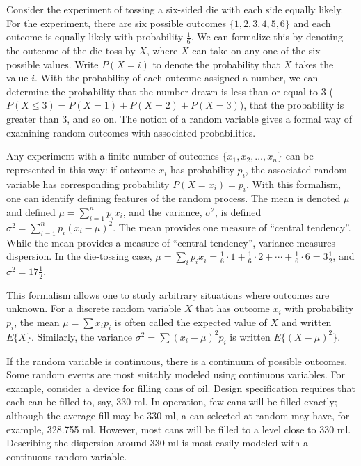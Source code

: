 \begin{original}
Consider the experiment of tossing a six-sided die with each side equally likely. For the experiment, there are six possible outcomes $\{1,2,3,4,5,6\}$ and each outcome is equally likely with probability $\frac{1}{6}$. We can formalize this by denoting the outcome of the die toss by $X$, where $X$ can take on any one of the six possible values. Write $P(X = i)$ to denote the probability that $X$ takes the value $i$. With the probability of each outcome assigned a number, we can determine the probability that the number drawn is less than or equal to $3$ ($P(X \leq 3) = P(X = 1) + P(X = 2) + P(X = 3)$), that the probability is greater than $3$, and so on. The notion of a random variable gives a formal way of examining random outcomes with associated probabilities.

Any experiment with a finite number of outcomes $\{x_1, x_2, \ldots, x_n\}$ can be represented in this way: if outcome $x_i$ has probability $p_i$, the associated random variable has corresponding probability $P(X = x_i) = p_i$. With this formalism, one can identify defining features of the random process. The mean is denoted $\mu$ and defined $\mu = \sum_{i=1}^{n} p_i x_i$, and the variance, $\sigma^2$, is defined $\sigma^2 = \sum_{i=1}^{n} p_i(x_i - \mu)^2$. The mean provides one measure of ``central tendency''. While the mean provides a measure of ``central tendency'', variance measures dispersion. In the die-tossing case, $\mu = \sum_i p_i x_i = \frac{1}{6}\cdot 1 + \frac{1}{6}\cdot 2 + \cdots + \frac{1}{6}\cdot 6 = 3\frac{1}{2}$, and $\sigma^2 = 17\frac{1}{2}$.

This formalism allows one to study arbitrary situations where outcomes are unknown. For a discrete random variable $X$ that has outcome $x_i$ with probability $p_i$, the mean $\mu = \sum x_i p_i$ is often called the expected value of $X$ and written $E\{X\}$. Similarly, the variance $\sigma^2 = \sum (x_i - \mu)^2 p_i$ is written $E\{(X - \mu)^2\}$.

If the random variable is continuous, there is a continuum of possible outcomes. Some random events are most suitably modeled using continuous variables. For example, consider a device for filling cans of oil. Design specification requires that each can be filled to, say, 330 ml. In operation, few cans will be filled exactly; although the average fill may be 330 ml, a can selected at random may have, for example, 328.755 ml. However, most cans will be filled to a level close to 330 ml. Describing the dispersion around 330 ml is most easily modeled with a continuous random variable.
\end{original}
